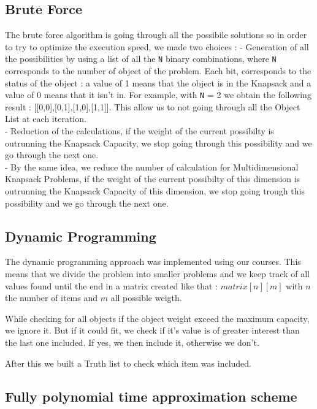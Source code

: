 \documentclass[a4paper, 11pt]{article}
\begin{document}
    

    
    \subsection{Brute Force}
    The brute force algorithm is going through all the possibile solutions so in order to try to optimize the execution speed, we made two choices : 
    \tabto{1.5cm} - Generation of all the possibilities by using a list of all the \verb+N+ binary combinations, where \verb+N+ corresponds to the number of object of the problem. Each bit, corresponds to the status of the object : a value of 1 means that the object is in the Knapsack and a value of 0 means that it isn't in. For example, with \verb+N+ = 2 we obtain the following result : [[0,0],[0,1],[1,0],[1,1]]. This allow us to not going through all the Object List at each iteration. \\
    \tabto{1.5cm} - Reduction of the calculations, if the weight of the current possibilty is outrunning the Knapsack Capacity, we stop going through this possibility and we go through the next one.\\
    \tabto{1.5cm} - By the same idea, we reduce the number of calculation for Multidimensional Knapsack Problems, if the weight of the current possibilty of this dimension is outrunning the Knapsack Capacity of this dimension, we stop going trough this possibility and we go through the next one.
    
    \subsection{Dynamic Programming}

    The dynamic programming approach was implemented using our courses. This means that we divide the problem into smaller problems and we keep track of all values found until the end in a matrix created like that : $matrix[n][m]$ with $n$ the number of items and $m$ all possible weigth.\par
    While checking for all objects if the object weight exceed the maximum capacity, we ignore it. But if it could fit, we check if it's value is of greater interest than the last one included. If yes, we then include it, otherwise we don't.\par

    After this we built a Truth list to check which item was included.



    \subsection{Fully polynomial time approximation scheme}
\end{document}
